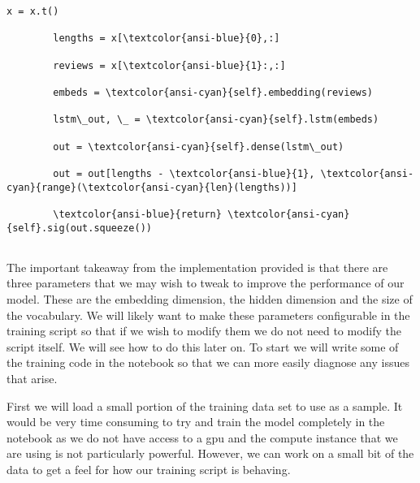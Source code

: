 \documentclass[11pt]{article}
\begin{document}
\begin{Verbatim}[commandchars=\\\{\}]
        x = x.t()

        lengths = x[\textcolor{ansi-blue}{0},:]

        reviews = x[\textcolor{ansi-blue}{1}:,:]

        embeds = \textcolor{ansi-cyan}{self}.embedding(reviews)

        lstm\_out, \_ = \textcolor{ansi-cyan}{self}.lstm(embeds)

        out = \textcolor{ansi-cyan}{self}.dense(lstm\_out)

        out = out[lengths - \textcolor{ansi-blue}{1}, \textcolor{ansi-cyan}{range}(\textcolor{ansi-cyan}{len}(lengths))]

        \textcolor{ansi-blue}{return} \textcolor{ansi-cyan}{self}.sig(out.squeeze())


    \end{Verbatim}

    The important takeaway from the implementation provided is that there
are three parameters that we may wish to tweak to improve the
performance of our model. These are the embedding dimension, the hidden
dimension and the size of the vocabulary. We will likely want to make
these parameters configurable in the training script so that if we wish
to modify them we do not need to modify the script itself. We will see
how to do this later on. To start we will write some of the training
code in the notebook so that we can more easily diagnose any issues that
arise.

First we will load a small portion of the training data set to use as a
sample. It would be very time consuming to try and train the model
completely in the notebook as we do not have access to a gpu and the
compute instance that we are using is not particularly powerful.
However, we can work on a small bit of the data to get a feel for how
our training script is behaving.
\end{document}
